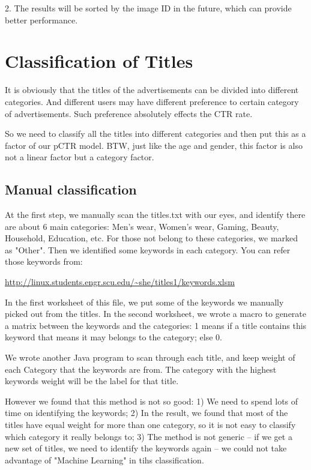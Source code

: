 \documentclass{article} %
\begin{document}
2. The results will be sorted by the image ID in the future, which can provide better performance.

\section{Classification of Titles}

It is obviously that the titles of the advertisements can be divided into different categories. And different users may have different preference to certain category of advertisements. Such preference absolutely effects the CTR rate.

So we need to classify all the titles into different categories and then put this as a factor of our pCTR model. BTW, just like the age and gender, this factor is also not a linear factor but a category factor.

\subsection{Manual classification}
At the first step, we manually scan the titles.txt with our eyes, and identify there are about 6 main categories: Men’s wear, Women’s wear, Gaming, Beauty, Household, Education, etc. For those not belong to these categories, we marked as "Other". Then we identified some keywords in each category. You can refer those keywords from:
\begin{center}
  \url{http://linux.students.engr.scu.edu/~she/titles1/keywords.xlsm}
\end{center}
In the first worksheet of this file, we put some of the keywords we manually picked out from the titles. In the second worksheet, we wrote a macro to generate a matrix between the keywords and the categories: 1 means if a title contains this keyword that means it may belongs to the category; else 0.

We wrote another Java program to scan through each title, and keep weight of each Category that the keywords are from. The category with the highest keywords weight will be the label for that title.

However we found that this method is not so good: 1) We need to spend lots of time on identifying the keywords; 2) In the result, we found that most of the titles have equal weight for more than one category, so it is not easy to classify which category it really belongs to; 3) The method is not generic --  if we get a new set of titles, we need to identify the keywords again -- we could not take advantage of "Machine Learning" in tihs classification.
\end{document}
